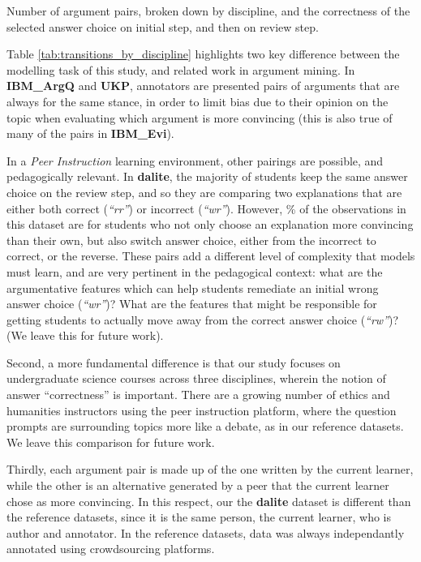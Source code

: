 \documentclass[runningheads]{llncs}
\begin{document}
\begin{table}
	\caption{Number of argument pairs, broken down by discipline, and the 
	correctness of the selected answer choice on initial step, and then on 
	review step.}
	
	\centerline{}
	
	\label{tab:transitions_by_discipline}
\end{table}

Table \ref{tab:transitions_by_discipline} highlights two key difference between 
the modelling task of this study, and related work in argument mining. 
In \textbf{IBM\_ArgQ} and \textbf{UKP}, annotators are presented pairs of 
arguments that are always for the same stance, in order to limit bias due to 
their opinion on the topic when evaluating which argument is more convincing 
(this is also true of many of the pairs in \textbf{IBM\_Evi}).

In a \textit{Peer Instruction} learning environment, other pairings are 
possible, and pedagogically relevant. 
In \textbf{dalite}, the majority of students keep the same answer choice 
on the review step, and so they are comparing two explanations that 
are either both correct (\textit{``rr''}) or incorrect (\textit{``wr''}). 
However, \% of the 
observations in this dataset are for students who not only choose an 
explanation more convincing than their own, but also switch answer choice, 
either from the incorrect to correct, or the reverse. 
These pairs add a different level of complexity that models must learn, and are 
very pertinent in the pedagogical context: what are the argumentative features 
which can help students remediate an initial wrong answer choice 
(\textit{``wr''})?
What are the features that might be responsible for getting students to 
actually move away from the correct answer choice (\textit{``rw''})?
(We leave this for future work).
 
Second, a more fundamental difference is that our study focuses on 
undergraduate science courses across three disciplines, wherein the notion of 
answer ``correctness'' is important.
There are a growing number of ethics and humanities instructors using the peer 
instruction platform, where the question prompts are surrounding topics more 
like a debate, as in our reference datasets. 
We leave this comparison for future work.

Thirdly, each argument pair is made up of the one written by the current 
learner, while the other is an alternative generated by a peer that the current 
learner chose as more convincing. 
In this respect, our the \textbf{dalite} dataset is different than the 
reference datasets, since it is the same person, the current learner, who is 
author and annotator. In the reference datasets, data was always independantly 
annotated using crowdsourcing platforms.
\end{document}
